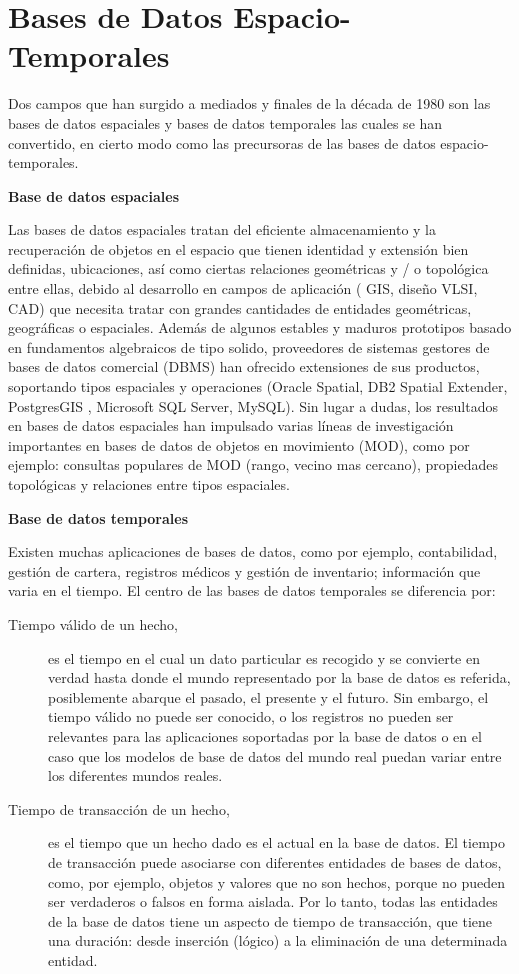 \section{Bases de Datos Espacio-Temporales}

Dos campos que han surgido a mediados y finales de la década de 1980 son las  bases de datos espaciales y bases de
datos temporales las cuales se han convertido, en cierto modo como  las precursoras de las bases de datos
espacio-temporales.


\textbf{Base de datos espaciales} 

Las bases de datos espaciales tratan del eficiente almacenamiento y la recuperación de objetos en
el espacio que tienen identidad y extensión bien definidas, ubicaciones, así como ciertas relaciones geométricas
y / o topológica entre ellas, debido al desarrollo en campos de aplicación ( GIS, diseño VLSI, CAD) que necesita
tratar  con  grandes cantidades de entidades geométricas, geográficas o espaciales. Además de algunos estables y 
maduros prototipos basado en fundamentos algebraicos de tipo solido,   proveedores de sistemas gestores de bases de
datos comercial (DBMS) han ofrecido extensiones de sus productos, soportando tipos espaciales y operaciones
(Oracle Spatial, DB2 Spatial Extender, PostgresGIS , Microsoft SQL Server, MySQL). Sin lugar a dudas, los 
resultados en bases de datos espaciales han impulsado varias líneas de investigación importantes en bases
de datos de objetos en movimiento (MOD), como por ejemplo: consultas  populares de MOD (rango, 
vecino mas cercano),  propiedades topológicas y relaciones entre tipos espaciales. \cite{yuzheng2011}


\textbf{Base de datos temporales}


Existen muchas aplicaciones de bases de datos, como por ejemplo, contabilidad, gestión de cartera, registros médicos
y gestión de inventario; información que varia en el tiempo. El centro de las bases de datos temporales se
diferencia por:

\begin{description}
 \item [Tiempo válido de un hecho,] es el tiempo en el cual un dato particular es recogido y se convierte en verdad
 hasta donde el mundo representado por la base de datos es referida, 
posiblemente abarque el pasado, el presente y el futuro. Sin embargo, el tiempo válido no puede ser 
conocido, o los registros no pueden ser relevantes para las aplicaciones soportadas por la base de datos
o en el caso que los modelos de base de datos del  mundo real puedan variar entre los diferentes mundos reales.

\item [Tiempo de transacción de un hecho,] es el tiempo que un hecho dado es el actual en la base de datos. 
El tiempo de transacción puede asociarse con diferentes entidades de bases de datos, como, por ejemplo,
objetos y valores que no son hechos, porque no pueden ser verdaderos o falsos en forma aislada. Por lo tanto, todas las entidades de la base de datos tiene un aspecto de  tiempo de transacción, que tiene
una duración: desde inserción (lógico) a la eliminación de una determinada entidad.
\end{description}


